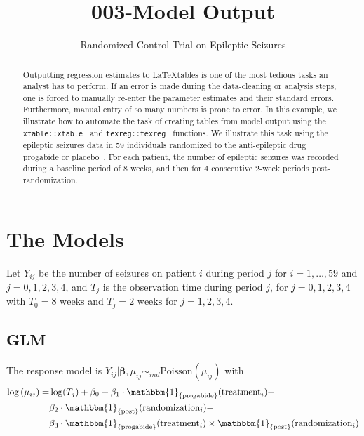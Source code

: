 \documentclass[11pt,letter]{article}\usepackage[]{graphicx}\usepackage[]{color}
\newcommand{\tm}[1]{\textrm{#1}}
\begin{document}
\pagestyle{fancy}

\title{003-Model Output}
\author{Randomized Control Trial on Epileptic Seizures}
\maketitle








\begin{abstract}
Outputting regression estimates to \LaTeX tables is one of the most tedious tasks an analyst has to perform. If an error is made during the data-cleaning or analysis steps, one is forced to manually re-enter the parameter estimates and their standard errors. Furthermore, manual entry of so many numbers is prone to error. In this example, we illustrate how to automate the task of creating tables from model output using the \texttt{xtable::xtable}~\citep{xtable} and \texttt{texreg::texreg}~\citep{texreg} functions. We illustrate this task using the epileptic seizures data in 59 individuals randomized to the anti-epileptic drug progabide or placebo~\citep{thall1990some}. For each patient, the number of epileptic seizures was recorded during a baseline period of 8 weeks, and then for 4 consecutive 2-week periods post-randomization. 
\end{abstract}


\section{The Models}
Let $Y_{ij}$ be the number of seizures on patient $i$ during period $j$ for $i=1,\ldots, 59$ and $j=0,1,2,3,4$, and $T_j$ is the observation time during period $j$, for $j=0,1,2,3,4$ with $T_0=8 \tm{ weeks}$ and $T_j=2\tm{ weeks}$ for $j=1,2,3,4$.   



\subsection{GLM}

The response model is $Y_{ij}|\boldsymbol{\beta},\mu_{ij} \sim_{ind} \tm{Poisson}(\mu_{ij})$ with
\begin{align}
\log \left(\mu_{ij} \right)  = &\log(T_{j}) + \beta_0 + \beta_1 \cdot  \mathbbm{1}_{\left\lbrace \tm{progabide} \right\rbrace }(\mbox{treatment}_{i}) + \nonumber \\ 
& \beta_2 \cdot  \mathbbm{1}_{\left\lbrace \tm{post} \right\rbrace }(\mbox{randomization}_{i}) + \nonumber \\ 
& \beta_3 \cdot \mathbbm{1}_{\left\lbrace \tm{progabide} \right\rbrace }(\mbox{treatment}_{i})  \times \mathbbm{1}_{\left\lbrace \tm{post} \right\rbrace }(\mbox{randomization}_{i})   \label{eq:eq1}
\end{align}
\end{document}
